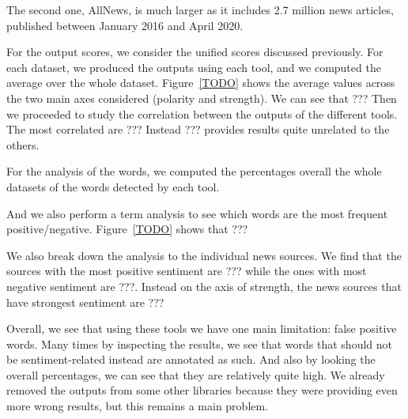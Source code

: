 The second one, AllNews, is much larger as it includes 2.7 million news articles, published between January 2016 and April 2020.


For the output scores, we consider the unified scores discussed previously. For each dataset, we produced the outputs using each tool, and we computed the average over the whole dataset.
Figure~\ref{TODO} shows the average values across the two main axes considered (polarity and strength). We can see that ???
Then we proceeded to study the correlation between the outputs of the different tools.
The most correlated are ???
Instead ??? provides results quite unrelated to the others.

For the analysis of the words, we computed the percentages overall the whole datasets of the words detected by each tool.

And we also perform a term analysis to see which words are the most frequent positive/negative. Figure~\ref{TODO} shows that ???

We also break down the analysis to the individual news sources.
We find that the sources with the most positive sentiment are ??? while the ones with most negative sentiment are ???.
Instead on the axis of strength, the news sources that have strongest sentiment are ???


Overall, we see that using these tools we have one main limitation: false positive words. Many times by inspecting the results, we see that words that should not be sentiment-related instead are annotated as such. And also by looking the overall percentages, we can see that they are relatively quite high.
We already removed the outputs from some other libraries because they were providing even more wrong results, but this remains a main problem.




